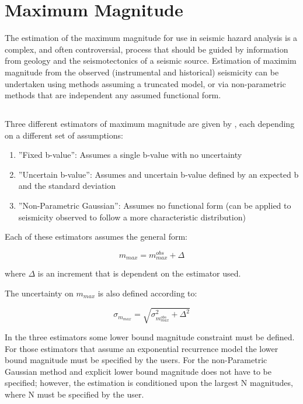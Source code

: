 \section{Maximum Magnitude}

The estimation of the maximum magnitude for use in seismic hazard analysis is a complex, and often controversial, process that should be guided by information from geology and the seismotectonics of a seismic source. Estimation of maximim magnitude from the observed (instrumental and historical) seismicity can be undertaken using methods assuming a truncated \cite{GutenbergRichter1944} model, or via non-parametric methods that are independent any assumed functional form. 

\subsection{\cite{Kijko2004}}

Three different estimators of maximum magnitude are given by \cite{Kijko2004}, each depending on a different set of assumptions:
\begin{enumerate}
\item ''Fixed b-value'': Assumes a single b-value with no uncertainty 
\item ''Uncertain b-value'': Assumes and uncertain b-value defined by an expected b and the standard deviation
\item ''Non-Parametric Gaussian'': Assumes no functional form (can be applied to seismicity observed to follow a more characteristic distribution)
\end{enumerate}

Each of these estimators assumes the general form:

\begin{equation}
m_{max} = m_{max}^{obs} + \Delta
\end{equation}

where $\Delta$ is an increment that is dependent on the estimator used.

The uncertainty on $m_{max}$ is also defined according to:

\begin{equation}
    \sigma_{m_{max}} = \sqrt{\sigma_{m_{max}^{obs}}^2 + \Delta^{2}}
\end{equation}

In the three estimators some lower bound magnitude constraint must be defined. For those estimators that assume an exponential recurrence model the lower bound magnitude must be specified by the users. For the non-Parametric Gaussian method and explicit lower bound magnitude does not have to be specified; however, the estimation is conditioned upon the largest N magnitudes, where N must be specified by the user.


